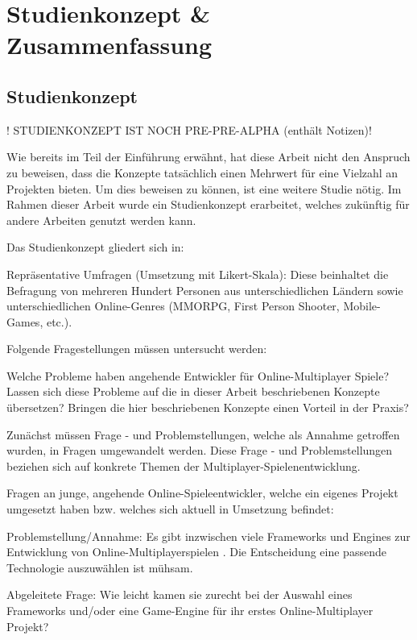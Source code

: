 \chapter{Studienkonzept \& Zusammenfassung }
\label{sec:zusammenfassung}

\section{Studienkonzept}
\label{studienkonzept}

! STUDIENKONZEPT IST NOCH PRE-PRE-ALPHA (enthält Notizen)!

Wie bereits im Teil der Einführung erwähnt, hat diese Arbeit nicht den Anspruch zu beweisen, dass die Konzepte tatsächlich einen Mehrwert für eine Vielzahl an Projekten bieten. Um dies beweisen zu können, ist eine weitere Studie nötig. Im Rahmen dieser Arbeit wurde ein Studienkonzept erarbeitet, welches zukünftig für andere Arbeiten genutzt werden kann.

Das Studienkonzept gliedert sich in:

Repräsentative Umfragen (Umsetzung mit Likert-Skala):
Diese beinhaltet die Befragung von mehreren Hundert Personen aus unterschiedlichen Ländern sowie unterschiedlichen Online-Genres (MMORPG, First Person Shooter, Mobile-Games, etc.).

Folgende Fragestellungen müssen untersucht werden:

Welche Probleme haben angehende Entwickler für Online-Multiplayer Spiele?
Lassen sich diese Probleme auf die in dieser Arbeit beschriebenen Konzepte übersetzen?
Bringen die hier beschriebenen Konzepte einen Vorteil in der Praxis?

Zunächst müssen Frage - und Problemstellungen, welche als Annahme getroffen wurden, in Fragen umgewandelt werden. Diese Frage - und Problemstellungen beziehen sich auf konkrete Themen der Multiplayer-Spielenentwicklung.

Fragen an junge, angehende Online-Spieleentwickler, welche ein eigenes Projekt umgesetzt haben bzw. welches sich aktuell in Umsetzung befindet:

Problemstellung/Annahme: Es gibt inzwischen viele Frameworks und Engines zur Entwicklung von Online-Multiplayerspielen \cite{MFatihMAR.2021}. Die Entscheidung eine passende Technologie auszuwählen ist mühsam.

Abgeleitete Frage: Wie leicht kamen sie zurecht bei der Auswahl eines Frameworks und/oder eine Game-Engine für ihr erstes Online-Multiplayer Projekt?


